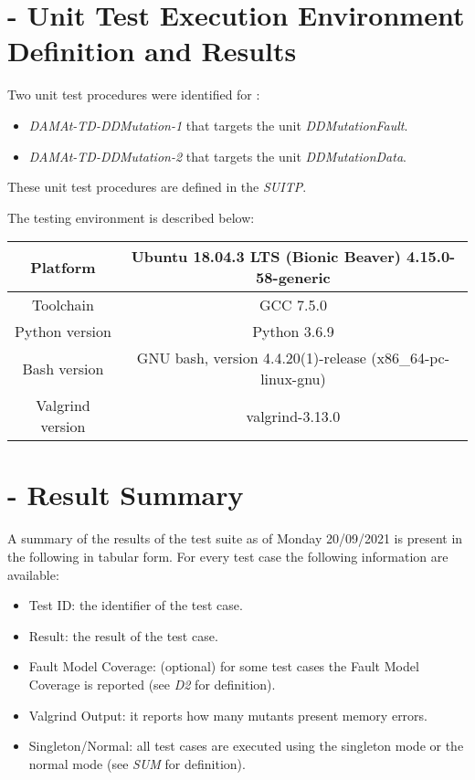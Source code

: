 
\chapter{\DAMA - Unit Test Execution Environment Definition and Results}

Two unit test procedures were identified for \DAMA:
\begin{itemize}
  \item {\emph{DAMAt-TD-DDMutation-1}} that targets the unit \emph{DDMutationFault}.
  \item {\emph{DAMAt-TD-DDMutation-2}} that targets the unit \emph{DDMutationData}.
\end{itemize}

These unit test procedures are defined in the \emph{SUITP}.

The testing environment is described below:

\begin{center}
\begin{tabular}{ |c|c| }
 \hline
 Platform & Ubuntu 18.04.3 LTS (Bionic Beaver) 4.15.0-58-generic \\
 \hline
 Toolchain & GCC 7.5.0 \\
 \hline
 Python version & Python 3.6.9 \\
 \hline
 Bash version & GNU bash, version 4.4.20(1)-release (x86\_64-pc-linux-gnu) \\
 \hline
 Valgrind version & valgrind-3.13.0 \\
 \hline
\end{tabular}
\end{center}


\chapter{\DAMA - Result Summary}

A summary of the results of the test suite as of Monday 20/09/2021 is present in the following in tabular form.
For every test case the following information are available:
\begin{itemize}
  \item{Test ID}: the identifier of the test case.
  \item{Result}: the result of the test case.
  \item{Fault Model Coverage}: (optional) for some test cases the Fault Model Coverage is reported (see \emph{D2} for definition).
  \item{Valgrind Output}: it reports how many mutants present memory errors.
  \item{Singleton/Normal}: all test cases are executed using the singleton mode or the normal mode (see \emph{SUM} for definition).
\end{itemize}

